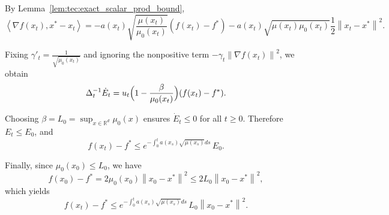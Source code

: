 \documentclass{article}
\def\R{{\mathbb{R}}}
\newcommand{\norm}[1]{\left\lVert#1\right\rVert}
\newcommand{\dotprod}[1]{\left< #1\right>}
\theoremstyle{plain}
\theoremstyle{definition}
\theoremstyle{remark}
\begin{document}
By Lemma~\ref{lem:tec:exact_scalar_prod_bound},
\[
\dotprod{\nabla f(x_t),x^\ast-x_t}
=
- a(x_t)\sqrt{\frac{\mu(x_t)}{\mu_0(x_t)}}(f(x_t)-f^\ast)
- a(x_t)\sqrt{\mu(x_t)\mu_0(x_t)}\frac{1}{2}\norm{x_t-x^\ast}^2 .
\]

Fixing $\gamma'_t = \frac{1}{\sqrt{\mu_0(x_t)}}$ and ignoring the nonpositive term
$-\gamma_t\norm{\nabla f(x_t)}^2$, we obtain
\begin{equation}
    \Delta_t^{-1}\dot E_t
    =
    u_t\Bigl(1-\frac{\beta}{\mu_0(x_t)}\Bigr)(f(x_t)-f^\ast).
\end{equation}

Choosing $\beta = L_0 = \sup_{x\in\R^d}\mu_0(x)$ ensures $\dot E_t \le 0$ for all $t\ge0$.
Therefore $E_t \le E_0$, and
\[
f(x_t)-f^\ast
\le
e^{-\int_0^t a(x_s)\sqrt{\mu(x_s)}ds}\,E_0.
\]

Finally, since $\mu_0(x_0)\le L_0$, we have
\[
f(x_0)-f^\ast = 2\mu_0(x_0)\norm{x_0-x^\ast}^2 \le 2L_0\norm{x_0-x^\ast}^2,
\]
which yields
\[
f(x_t)-f^\ast
\le
e^{-\int_0^t a(x_s)\sqrt{\mu(x_s)}ds}\,L_0\norm{x_0-x^\ast}^2.
\]
\end{document}
